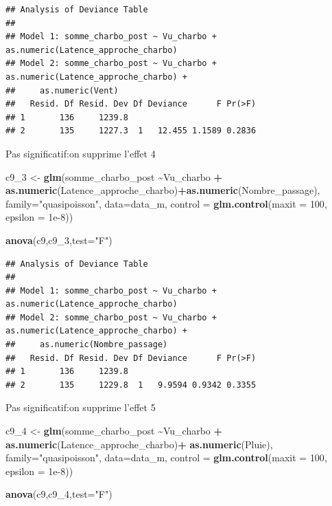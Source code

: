 \documentclass[
  french,
]{article}
\newenvironment{Shaded}{\begin{snugshade}}{\end{snugshade}}
\newcommand{\AttributeTok}[1]{\textcolor[rgb]{0.13,0.29,0.53}{#1}}
\newcommand{\DecValTok}[1]{\textcolor[rgb]{0.00,0.00,0.81}{#1}}
\newcommand{\FloatTok}[1]{\textcolor[rgb]{0.00,0.00,0.81}{#1}}
\newcommand{\FunctionTok}[1]{\textcolor[rgb]{0.13,0.29,0.53}{\textbf{#1}}}
\newcommand{\NormalTok}[1]{#1}
\newcommand{\OtherTok}[1]{\textcolor[rgb]{0.56,0.35,0.01}{#1}}
\newcommand{\SpecialCharTok}[1]{\textcolor[rgb]{0.81,0.36,0.00}{\textbf{#1}}}
\newcommand{\StringTok}[1]{\textcolor[rgb]{0.31,0.60,0.02}{#1}}
\begin{document}
\begin{verbatim}
## Analysis of Deviance Table
## 
## Model 1: somme_charbo_post ~ Vu_charbo + as.numeric(Latence_approche_charbo)
## Model 2: somme_charbo_post ~ Vu_charbo + as.numeric(Latence_approche_charbo) + 
##     as.numeric(Vent)
##   Resid. Df Resid. Dev Df Deviance      F Pr(>F)
## 1       136     1239.8                          
## 2       135     1227.3  1   12.455 1.1589 0.2836
\end{verbatim}

Pas significatif:on supprime l'effet 4

\begin{Shaded}
\begin{Highlighting}[]
\NormalTok{c9\_3 }\OtherTok{\textless{}{-}} \FunctionTok{glm}\NormalTok{(somme\_charbo\_post }\SpecialCharTok{\textasciitilde{}}\NormalTok{Vu\_charbo }\SpecialCharTok{+} \FunctionTok{as.numeric}\NormalTok{(Latence\_approche\_charbo)}\SpecialCharTok{+}\FunctionTok{as.numeric}\NormalTok{(Nombre\_passage), }\AttributeTok{family=}\StringTok{"quasipoisson"}\NormalTok{, }\AttributeTok{data=}\NormalTok{data\_m, }
            \AttributeTok{control =} \FunctionTok{glm.control}\NormalTok{(}\AttributeTok{maxit =} \DecValTok{100}\NormalTok{, }\AttributeTok{epsilon =} \FloatTok{1e{-}8}\NormalTok{))}

\FunctionTok{anova}\NormalTok{(c9,c9\_3,}\AttributeTok{test=}\StringTok{"F"}\NormalTok{)}
\end{Highlighting}
\end{Shaded}

\begin{verbatim}
## Analysis of Deviance Table
## 
## Model 1: somme_charbo_post ~ Vu_charbo + as.numeric(Latence_approche_charbo)
## Model 2: somme_charbo_post ~ Vu_charbo + as.numeric(Latence_approche_charbo) + 
##     as.numeric(Nombre_passage)
##   Resid. Df Resid. Dev Df Deviance      F Pr(>F)
## 1       136     1239.8                          
## 2       135     1229.8  1   9.9594 0.9342 0.3355
\end{verbatim}

Pas significatif:on supprime l'effet 5

\begin{Shaded}
\begin{Highlighting}[]
\NormalTok{c9\_4 }\OtherTok{\textless{}{-}} \FunctionTok{glm}\NormalTok{(somme\_charbo\_post }\SpecialCharTok{\textasciitilde{}}\NormalTok{Vu\_charbo }\SpecialCharTok{+} \FunctionTok{as.numeric}\NormalTok{(Latence\_approche\_charbo)}\SpecialCharTok{+} \FunctionTok{as.numeric}\NormalTok{(Pluie), }\AttributeTok{family=}\StringTok{"quasipoisson"}\NormalTok{, }\AttributeTok{data=}\NormalTok{data\_m, }
            \AttributeTok{control =} \FunctionTok{glm.control}\NormalTok{(}\AttributeTok{maxit =} \DecValTok{100}\NormalTok{, }\AttributeTok{epsilon =} \FloatTok{1e{-}8}\NormalTok{))}

\FunctionTok{anova}\NormalTok{(c9,c9\_4,}\AttributeTok{test=}\StringTok{"F"}\NormalTok{)}
\end{Highlighting}
\end{Shaded}
\end{document}
